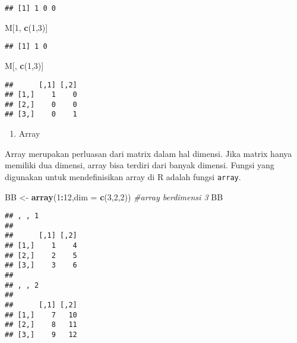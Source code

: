 \documentclass[
]{book}
\newenvironment{Shaded}{\begin{snugshade}}{\end{snugshade}}
\newcommand{\CommentTok}[1]{\textcolor[rgb]{0.56,0.35,0.01}{\textit{#1}}}
\newcommand{\DataTypeTok}[1]{\textcolor[rgb]{0.13,0.29,0.53}{#1}}
\newcommand{\DecValTok}[1]{\textcolor[rgb]{0.00,0.00,0.81}{#1}}
\newcommand{\KeywordTok}[1]{\textcolor[rgb]{0.13,0.29,0.53}{\textbf{#1}}}
\newcommand{\NormalTok}[1]{#1}
\newcommand{\OperatorTok}[1]{\textcolor[rgb]{0.81,0.36,0.00}{\textbf{#1}}}
\newcommand{\StringTok}[1]{\textcolor[rgb]{0.31,0.60,0.02}{#1}}
\providecommand{\tightlist}{%
  \setlength{\itemsep}{0pt}\setlength{\parskip}{0pt}}
\begin{document}
\begin{verbatim}
## [1] 1 0 0
\end{verbatim}

\begin{Shaded}
\begin{Highlighting}[]
\NormalTok{M[}\DecValTok{1}\NormalTok{, }\KeywordTok{c}\NormalTok{(}\DecValTok{1}\NormalTok{,}\DecValTok{3}\NormalTok{)]}
\end{Highlighting}
\end{Shaded}

\begin{verbatim}
## [1] 1 0
\end{verbatim}

\begin{Shaded}
\begin{Highlighting}[]
\NormalTok{M[, }\KeywordTok{c}\NormalTok{(}\DecValTok{1}\NormalTok{,}\DecValTok{3}\NormalTok{)]}
\end{Highlighting}
\end{Shaded}

\begin{verbatim}
##      [,1] [,2]
## [1,]    1    0
## [2,]    0    0
## [3,]    0    1
\end{verbatim}

\begin{enumerate}
\def\labelenumi{\arabic{enumi}.}
\setcounter{enumi}{3}
\tightlist
\item
  Array
\end{enumerate}

Array merupakan perluasan dari matrix dalam hal dimensi. Jika matrix hanya memiliki dua dimensi, array bisa terdiri dari banyak dimensi. Fungsi yang digunakan untuk mendefinisikan array di R adalah fungsi \texttt{array}.

\begin{Shaded}
\begin{Highlighting}[]
\NormalTok{BB \textless{}{-}}\StringTok{ }\KeywordTok{array}\NormalTok{(}\DecValTok{1}\OperatorTok{:}\DecValTok{12}\NormalTok{,}\DataTypeTok{dim =} \KeywordTok{c}\NormalTok{(}\DecValTok{3}\NormalTok{,}\DecValTok{2}\NormalTok{,}\DecValTok{2}\NormalTok{)) }\CommentTok{\#array berdimensi 3}
\NormalTok{BB}
\end{Highlighting}
\end{Shaded}

\begin{verbatim}
## , , 1
## 
##      [,1] [,2]
## [1,]    1    4
## [2,]    2    5
## [3,]    3    6
## 
## , , 2
## 
##      [,1] [,2]
## [1,]    7   10
## [2,]    8   11
## [3,]    9   12
\end{verbatim}
\end{document}
